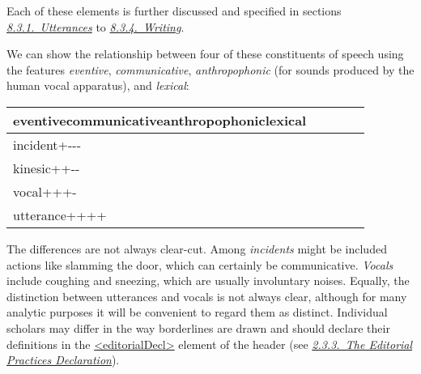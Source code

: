 \par
Each of these elements is further discussed and specified in sections \textit{\hyperref[TSBAUT]{8.3.1.\ Utterances}} to \textit{\hyperref[TSBAWR]{8.3.4.\ Writing}}.\par
We can show the relationship between four of these constituents of speech using the features \textit{eventive}, \textit{communicative}, \textit{anthropophonic} (for sounds produced by the human vocal apparatus), and \textit{lexical}:  \par 
\begin{longtable}{P{0.28977272727272724\textwidth}P{0.11590909090909089\textwidth}P{0.16420454545454544\textwidth}P{0.17386363636363636\textwidth}P{0.10625\textwidth}}
 \tabcellsep eventive\tabcellsep communicative\tabcellsep anthropophonic\tabcellsep lexical\\\hline 
incident\tabcellsep +\tabcellsep -\tabcellsep -\tabcellsep -\\
kinesic\tabcellsep +\tabcellsep +\tabcellsep -\tabcellsep -\\
vocal\tabcellsep +\tabcellsep +\tabcellsep +\tabcellsep -\\
utterance\tabcellsep +\tabcellsep +\tabcellsep +\tabcellsep +\end{longtable} \par
  The differences are not always clear-cut. Among \textit{incidents} might be included actions like slamming the door, which can certainly be communicative. \textit{Vocals} include coughing and sneezing, which are usually involuntary noises. Equally, the distinction between utterances and vocals is not always clear, although for many analytic purposes it will be convenient to regard them as distinct. Individual scholars may differ in the way borderlines are drawn and should declare their definitions in the \hyperref[TEI.editorialDecl]{<editorialDecl>} element of the header (see \textit{\hyperref[HD53]{2.3.3.\ The Editorial Practices Declaration}}).\par
